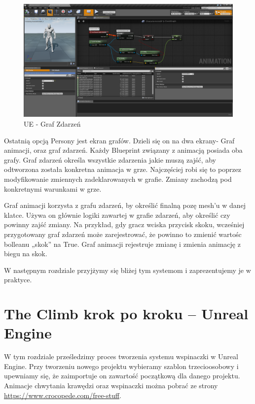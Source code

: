 \documentclass[brudnopis]{xmgr}
\begin{document}
\begin{figure}[!htb]
    \begin{center}
    \includegraphics[scale=0.25]{Screeny/EventGraph_Event}
    \end{center}
    \caption{UE - Graf Zdarzeń}
\end{figure}

Ostatnią opcją Persony jest ekran grafów. Dzieli się on na dwa ekrany- Graf animacji, oraz graf zdarzeń. Każdy Blueprint związany z animacją posiada oba grafy.
Graf zdarzeń określa wszystkie zdarzenia jakie muszą zajść, aby odtworzona została konkretna animacja w grze. Najczęściej robi się to poprzez modyfikowanie zmiennych zadeklarowanych w grafie. Zmiany zachodzą pod konkretnymi warunkami w grze.

Graf animacji korzysta z grafu zdarzeń, by określić finalną pozę mesh’u w danej klatce. Używa on głównie logiki zawartej w grafie zdarzeń, aby określić czy powinny zajść zmiany. Na przykład, gdy gracz wciska przycisk skoku, wcześniej przygotowany graf zdarzeń może zarejestrować, że powinno to zmienić wartośc bolleanu „skok” na True.  Graf animacji rejestruje zmianę i zmienia animację z biegu na skok.

W następnym rozdziale przyjżymy się bliżej tym systemom i zaprezentujemy je w praktyce.

\chapter{The Climb krok po kroku -- Unreal Engine}

W tym rozdziale prześledzimy proces tworzenia systemu wspinaczki w Unreal Engine. Przy tworzeniu nowego projektu wybieramy szablon trzecioosobowy i upewniamy się, że zaimportuje on zawartość początkową dla danego projektu. Animacje chwytania krawędzi oraz wspinaczki można pobrać ze strony \url{https://www.crocopede.com/free-stuff}.
\end{document}
